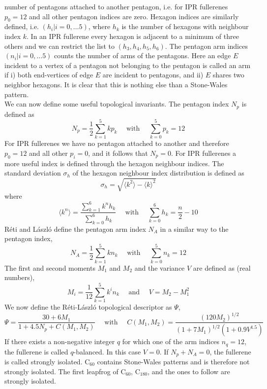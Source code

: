 \documentclass[article,a4paper,twoside]{memoir}
\newcommand{\C}[1]{\ensuremath{\mathrm{C}_{#1}}}
\begin{document}
number of pentagons attached to another pentagon, i.e. for IPR fullerenes $p_0 = 12$ and all other pentagon indices are zero. Hexagon indices are similarly
defined, i.e. $(h_i | i=0, \dots 5)$, where $h_k$ is the number of hexagons with neighbour index $k$. In an IPR fullerene every hexagon is adjacent to a
minimum of three others and we can restrict the list to $(h_3, h_4, h_5, h_6)$. The pentagon arm indices $(n_i | i=0, \dots 5)$ counts the number of arms
of the pentagons. Here an edge $E$ incident to a vertex of a pentagon not belonging to the pentagon is called an arm if i) both end-vertices of edge $E$ 
are incident to pentagons, and ii) $E$ shares two neighbor hexagons.\cite{Reti} It is clear that this is nothing else than a Stone-Wales pattern.\\
We can now define some useful topological invariants. The pentagon index $N_p$ is defined as
\begin{equation}
  \label{pentindex}
  N_p = \frac{1}{2}\sum_{k=1}^{5} kp_k \quad \text{ with } \quad  \sum_{k=0}^{5} p_k = 12
\end{equation}
For IPR fullerenes we have no pentagon attached to another and therefore $p_0 = 12$ and all other $p_i = 0$, and it follows that $N_p = 0$. For IPR fullerenes
a more useful index is defined through the hexagon neighbour indices. The standard deviation $\sigma_h$ of the hexagon neighbour index distribution is defined as
\begin{equation}
  \label{standev}
  \sigma_h = \sqrt{\langle k^2 \rangle - \langle k \rangle^2}
\end{equation}
where
\begin{equation}
  \label{mean}
  \langle k^n \rangle = \frac{\sum_{k=1}^{6} k^n h_k}{\sum_{k=0}^{6} h_k}  \quad \text{ with } \quad  \sum_{k=0}^{6} h_k = \frac{n}{2} - 10
\end{equation}
R\'eti and L\'aszl\'o define the pentagon arm index $N_A$ in a similar way to the pentagon index,\cite{Reti}
\begin{equation}
  \label{arms}
  N_A = \frac{1}{2}\sum_{k=1}^{5} kn_k  \quad \text{ with } \quad  \sum_{k=0}^{5} n_k = 12
\end{equation}
The first and second moments $M_1$ and $M_2$ and the variance $V$ are defined as (real numbers),
\begin{equation}
  \label{Moments}
  M_i = \frac{1}{12}\sum_{k=1}^{5} k^i n_k  \quad \text{ and } \quad  V = M_2 - M_1^2
\end{equation}
We now define the R\'eti-L\'aszl\'o topological descriptor as $\Psi$,
\begin{equation}
  \label{Moments}
  \Psi = \frac{30+6M_1}{1+4.5N_p+C(M_1,M_2)} \quad \text{ with } \quad  C(M_1,M_2) = \frac{(120M_2)^{1/2}}{(1+7M_1)^{1/2}(1+0.9V^{1.5})}
\end{equation}
If there exists a non-negative integer $q$ for which one of the arm indices $n_q = 12$, the fullerene is called $q$-balanced. In this
case $V = 0$.\cite{Reti} If $N_p + N_A = 0$, the fullerene is called strongly isolated. \C{60} contains Stone-Wales patterns and is therefore not
strongly isolated. The first leapfrog of \C{60}, \C{180}, and the ones to follow are strongly isolated.
\end{document}
